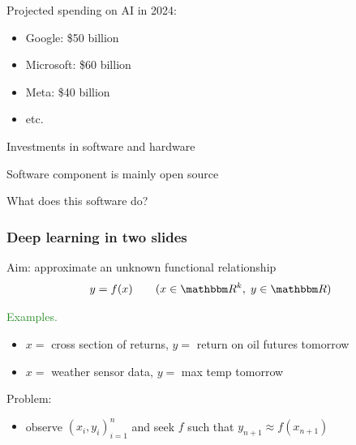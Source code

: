 \documentclass[
    xcolor={svgnames,dvipsnames},
    hyperref={colorlinks, citecolor=DeepPink4, linkcolor=DarkRed, urlcolor=DarkBlue}
    ]{beamer}  %
\newcommand{\Egs}{\textcolor{ForestGreen}{Examples. }}
\newcommand{\1}{\mathbbm 1}
\newcommand{\RR}{\mathbbm R}
\begin{document}
\begin{frame}
    
    Projected spending on AI in 2024:

    \begin{itemize}
        \item Google: \$50 billion
        \vspace{0.5em}
        \item Microsoft: \$60 billion
        \vspace{0.5em}
        \item Meta: \$40 billion
        \vspace{0.5em}
        \item etc.
    \end{itemize}

    Investments in software and hardware

        \vspace{0.5em}
        \vspace{0.5em}
    Software component is mainly open source
        \vspace{0.5em}
        \vspace{0.5em}

    What does this software do?

\end{frame}





\begin{frame}
    \frametitle{Deep learning in two slides}
    
    Aim: approximate an unknown functional relationship
    \begin{equation*}
        y = f(x)
        \qquad (x \in \RR^k, \; y \in \RR)
    \end{equation*}

    \Egs
    \begin{itemize}
        \item $x = $ cross section of returns, $y = $ return on oil futures tomorrow
        \vspace{0.5em}
        \item $x = $ weather sensor data, $y = $ max temp tomorrow
    \end{itemize}
        \vspace{0.5em}
        \vspace{0.5em}

    Problem:

    \begin{itemize}
        \item observe $(x_i, y_i)_{i=1}^n$ and seek $f$ such that $y_{n+1}
            \approx f(x_{n+1})$
    \end{itemize}


\end{frame}
\end{document}
